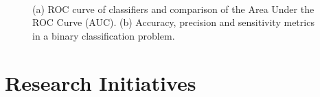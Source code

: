 \documentclass{ieeeaccess}
\begin{document}
\begin{figure}[ht]
    \begin{center}
        \mbox{
        }
        \mbox{
        }
    \end{center}
    \caption{(a) ROC curve of classifiers and comparison of the Area Under the ROC Curve (AUC). (b) Accuracy, precision and sensitivity metrics in a binary classification problem.}
    \label{fig:metricas_roc}
\end{figure}


\section{Research Initiatives}
\label{sec:research}
\end{document}
